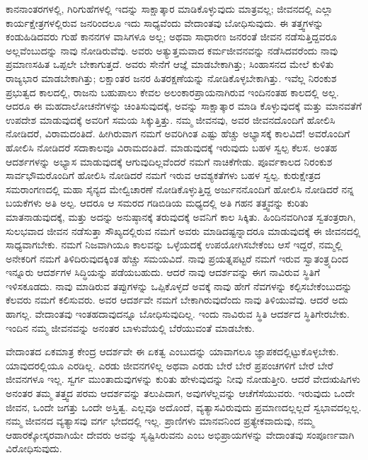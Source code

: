 ಕಾನನಾಂತರಗಳಲ್ಲಿ, ಗಿರಿಗುಹೆಗಳಲ್ಲಿ ಇದನ್ನು ಸಾಕ್ಷಾತ್ಕಾರ ಮಾಡಿಕೊಳ್ಳುವುದು ಮಾತ್ರವಲ್ಲ; ಜೀವನದಲ್ಲಿ ಎಲ್ಲಾ ಕಾರ್ಯಕ್ಷೇತ್ರಗಳಲ್ಲಿರುವ ಜನರಿಂದಲೂ ಇದು ಸಾಧ್ಯವೆಂದು ವೇದಾಂತವು ಬೋಧಿಸುವುದು. ಈ ತತ್ತ್ವಗಳನ್ನು ಕಂಡುಹಿಡಿದವರು ಗುಹೆ ಕಾನನಗಳ ವಾಸಿಗಳೂ ಅಲ್ಲ; ಅಥವಾ ಸಾಧಾರಣ ಜನರಂತೆ ಜೀವನ ನಡೆಸುತ್ತಿದ್ದವರೂ ಅಲ್ಲವೆಂಬುದನ್ನು ನಾವು ನೋಡಿರುವೆವು. ಅವರು ಅತ್ಯುತ್ತಮವಾದ ಕರ್ಮಜೀವನವನ್ನು ನಡೆಸಿದವರೆಂದು ನಾವು ಪ್ರಮಾಣಸಹಿತ ಒಪ್ಪಲೇ ಬೇಕಾಗುತ್ತದೆ. ಅವರು ಸೇನೆಗೆ ಆಜ್ಞೆ ಮಾಡಬೇಕಾಗಿತ್ತು; ಸಿಂಹಾಸನದ ಮೇಲೆ ಕುಳಿತು ರಾಜ್ಯಭಾರ ಮಾಡಬೇಕಾಗಿತ್ತು; ಲಕ್ಷಾಂತರ ಜನರ ಹಿತರಕ್ಷಣೆಯನ್ನು ನೋಡಿಕೊಳ್ಳಬೇಕಾಗಿತ್ತು. ಇವೆಲ್ಲ ನಿರಂಕುಶ ಪ್ರಭುತ್ವದ ಕಾಲದಲ್ಲಿ, ರಾಜನು ಬಹುಪಾಲು ಕೇವಲ ಅಲಂಕಾರಪ್ರಾಯನಾಗಿರುವ ಇಂದಿನಂತಹ ಕಾಲದಲ್ಲಿ ಅಲ್ಲ. ಆದರೂ ಈ ಮಹದಾಲೋಚನೆಗಳನ್ನು ಚಿಂತಿಸುವುದಕ್ಕೆ, ಅವನ್ನು ಸಾಕ್ಷಾತ್ಕಾರ ಮಾಡಿ ಕೊಳ್ಳುವುದಕ್ಕೆ ಮತ್ತು ಮಾನವತೆಗೆ ಉಪದೇಶ ಮಾಡುವುದಕ್ಕೆ ಅವರಿಗೆ ಸಮಯ ಸಿಕ್ಕುತ್ತಿತ್ತು. ನಮ್ಮ ಜೀವನವು, ಅವರ ಜೀವನದೊಂದಿಗೆ ಹೋಲಿಸಿ ನೋಡಿದರೆ, ವಿರಾಮದಂತಿದೆ. ಹೀಗಿರುವಾಗ ನಮಗೆ ಅವರಿಗಿಂತ ಎಷ್ಟು ಹೆಚ್ಚು ಅಭ್ಯಾಸಕ್ಕೆ ಕಾಲವಿದೆ! ಅವರೊಂದಿಗೆ ಹೋಲಿಸಿ ನೋಡಿದರೆ ಸದಾಕಾಲವೂ ವಿರಾಮದಂತಿದೆ. ಮಾಡುವುದಕ್ಕೆ ಇರುವುದು ಬಹಳ ಸ್ವಲ್ಪ ಕೆಲಸ. ಅಂತಹ ಆದರ್ಶಗಳನ್ನು ಅಭ್ಯಾಸ ಮಾಡುವುದಕ್ಕೆ ಆಗುವುದಿಲ್ಲವೆಂದರೆ ನಮಗೆ ನಾಚಿಕೆಗೇಡು. ಪೂರ್ವಕಾಲದ ನಿರಂಕುಶ ಸಾರ್ವಭೌಮರೊಂದಿಗೆ ಹೋಲಿಸಿ ನೋಡಿದರೆ ನಮಗೆ ಇರುವ ಆವಶ್ಯಕತೆಗಳು ಬಹಳ ಸ್ವಲ್ಪ. ಕುರುಕ್ಷೇತ್ರದ ಸಮರಾಂಗಣದಲ್ಲಿ ಮಹಾ ಸೈನ್ಯದ ಮೇಲ್ವಿಚಾರಣೆ ನೋಡಿಕೊಳ್ಳುತ್ತಿದ್ದ ಅರ್ಜುನನೊಂದಿಗೆ ಹೋಲಿಸಿ ನೋಡಿದರೆ ನನ್ನ ಬಯಕೆಗಳು ಅತಿ ಅಲ್ಪ. ಆದರೂ ಆ ಸಮರದ ಗಡಿಬಿಡಿಯ ಮಧ್ಯದಲ್ಲಿ ಅತಿ ಗಹನ ತತ್ತ್ವವನ್ನು ಕುರಿತು ಮಾತನಾಡುವುದಕ್ಕೆ, ಮತ್ತು ಅದನ್ನು ಅನುಷ್ಠಾನಕ್ಕೆ ತರುವುದಕ್ಕೆ ಅವನಿಗೆ ಕಾಲ ಸಿಕ್ಕಿತು. ಹಿಂದಿನವರಿಗಿಂತ ಸ್ವತಂತ್ರರಾಗಿ, ಸುಲಭವಾದ ಜೀವನ ನಡೆಸುತ್ತಾ ಸೌಖ್ಯದಲ್ಲಿರುವ ನಮಗೆ ಅವರು ಮಾಡಿದಷ್ಟನ್ನಾದರೂ ಮಾಡುವುದಕ್ಕೆ ಈ ಜೀವನದಲ್ಲಿ ಸಾಧ್ಯವಾಗಬೇಕು. ನಮಗೆ ನಿಜವಾಗಿಯೂ ಕಾಲವನ್ನು ಒಳ್ಳೆಯದಕ್ಕೆ ಉಪಯೋಗಿಸಬೇಕೆಂಬ ಆಸೆ ಇದ್ದರೆ, ನಮ್ಮಲ್ಲಿ ಅನೇಕರಿಗೆ ನಮಗೆ ತಿಳಿದಿರುವುದಕ್ಕಿಂತ ಹೆಚ್ಚು ಸಮಯವಿದೆ. ನಾವು ಪ್ರಯತ್ನಪಟ್ಟರೆ ನಮಗೆ ಇರುವ ಸ್ವಾತಂತ್ರ್ಯದಿಂದ ಇನ್ನೂರು ಆದರ್ಶಗಳ ಸಿದ್ಧಿಯನ್ನು ಪಡೆಯಬಹುದು. ಆದರೆ ನಾವು ಆದರ್ಶವನ್ನು ಈಗ ನಾವಿರುವ ಸ್ಥಿತಿಗೆ ಇಳಿಸಕೂಡದು. ನಾವು ಮಾಡಿರುವ ತಪ್ಪುಗಳನ್ನು ಒಪ್ಪಿಕೊಳ್ಳದೆ ಅವಕ್ಕೆ ನಾವು ಹೇಗೆ ನೆವಗಳನ್ನು ಕಲ್ಪಿಸಬೇಕೆಂಬುದನ್ನು ಕೆಲವರು ನಮಗೆ ಕಲಿಸುವರು. ಅವರ ಆದರ್ಶವೇ ನಮಗೆ ಬೇಕಾಗಿರುವುದೆಂದು ನಾವು ತಿಳಿಯುವೆವು. ಆದರೆ ಅದು ಹಾಗಲ್ಲ. ವೇದಾಂತವು ಇಂತಹದಾವುದನ್ನೂ ಬೋಧಿಸುವುದಿಲ್ಲ. ಇಂದು ನಾವಿರುವ ಸ್ಥಿತಿ ಆದರ್ಶದ ಸ್ಥಿತಿಗೇರಬೇಕು. ಇಂದಿನ ನಮ್ಮ ಜೀವನವನ್ನು ಅನಂತರ ಬಾಳುವೆಯಲ್ಲಿ ಬೆರೆಯುವಂತೆ ಮಾಡಬೇಕು. 

\vskip 8pt

ವೇದಾಂತದ ಏಕಮಾತ್ರ ಕೇಂದ್ರ ಆದರ್ಶವೇ ಈ ಏಕತ್ವ ಎಂಬುದನ್ನು ಯಾವಾಗಲೂ ಜ್ಞಾಪಕದಲ್ಲಿಟ್ಟುಕೊಳ್ಳಬೇಕು. ಯಾವುದರಲ್ಲಿಯೂ ಎರಡಿಲ್ಲ. ಎರಡು ಜೀವನಗಳಿಲ್ಲ ಅಥವಾ ಎರಡು ಬೇರೆ ಬೇರೆ ಪ್ರಪಂಚಗಳಿಗೆ ಬೇರೆ ಬೇರೆ ಜೀವನಗಳೂ ಇಲ್ಲ. ಸ್ವರ್ಗ ಮುಂತಾದುವುಗಳನ್ನು ಕುರಿತು ಹೇಳುವುದನ್ನು ನೀವು ನೋಡುತ್ತೀರಿ. ಆದರೆ ವೇದಋಷಿಗಳು ಅನಂತರ ತಮ್ಮ ತತ್ತ್ವದ ಪರಮ ಆದರ್ಶವನ್ನು ತಲುಪಿದಾಗ, ಅವುಗಳೆಲ್ಲವನ್ನು ಆಚೆಗೆಸೆಯುವರು. ಇರುವುದು ಒಂದೇ ಜೀವನ, ಒಂದೇ ಜಗತ್ತು ಒಂದೇ ಅಸ್ತಿತ್ವ. ಎಲ್ಲವೂ ಅದೊಂದೆ, ವ್ಯತ್ಯಾಸವಿರುವುದು ಪ್ರಮಾಣದಲ್ಲಲ್ಲದೆ ಸ್ವಭಾವದಲ್ಲಲ್ಲ. ನಮ್ಮ ಜೀವನದ ವ್ಯತ್ಯಾಸವು ವರ್ಗ ಭೇದದಲ್ಲಿ ಇಲ್ಲ. ಪ್ರಾಣಿಗಳು ಮಾನವನಿಂದ ಪ್ರತ್ಯೇಕವಾದುವು, ನಮ್ಮ ಆಹಾರಕ್ಕೋಸ್ಕರವಾಗಿಯೇ ದೇವರು ಅವನ್ನು ಸೃಷ್ಟಿಸಿರುವನು ಎಂಬ ಅಭಿಪ್ರಾಯಗಳನ್ನು ವೇದಾಂತವು ಸಂಪೂರ್ಣವಾಗಿ ವಿರೋಧಿಸುವುದು. 

